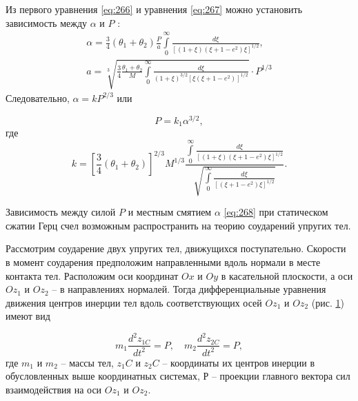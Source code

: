\documentclass[specialist, subf, href, colorlinks=true, 14pt, final]{disser}
\theoremstyle{definition}
\begin{document}
  Из первого уравнения \eqref{eq:266} и уравнения \eqref{eq:267} можно установить зависимость между $\alpha$ и $P$ :
  \[ 
  \begin{array}{l}
    \alpha = \displaystyle \frac{3}{4}(\theta_1 + \theta_2) \displaystyle \frac{P}{a} \int \limits_0^{\infty} \displaystyle \frac{d \xi}{\left[(1 + \xi)(\xi + 1 - e^2)\xi\right]^{1/2}},\\
    a = \sqrt[\displaystyle 3]{\displaystyle \frac{3}{4} \frac{\theta_1 + \theta_2}{M} \int\limits_0^{\infty} \displaystyle \frac{d \xi}{(1 + \xi)^{3/2}\left[\xi(\xi + 1 - e^2)\right]^{1/2}} } \cdot P^{1/3}
  \end{array}
  \]
  Следовательно, $\alpha = k P^{2/3}$ или 
  \addtocounter{equation}{1}
  \begin{equation}\label{eq:268}
   P = k_1\alpha^{3/2},
    \tag{8}
  \end{equation}
  где
  \[ 
    k = \left[ \frac{3}{4}(\theta_1 + \theta_2) \right]^{2/3} M^{1/3} \frac{ \displaystyle \int\limits_0^{\infty} \frac{d \xi}{\left[(1 + \xi)(\xi + 1 - e^2)\xi\right]^{1/2}} }{\displaystyle \sqrt{\int\limits_0^{\infty} \frac{d \xi}{\left[(\xi + 1 - e^2)\xi\right]^{1/2}}}}.
   \]

Зависимость между силой $P$ и местным смятием $\alpha$ \eqref{eq:268} при статическом сжатии Герц счел возможным распространить на теорию соударений упругих тел.

Рассмотрим соударение двух упругих тел, движущихся 
поступательно. Скорости в момент соударения предположим 
направленными вдоль нормали в месте контакта тел. Расположим оси координат $Ox$ и $Oy$ в касательной плоскости, а оси $Oz_1$ и $Oz_2$ -- в направлениях нормалей. Тогда дифференциальные уравнения движения центров инерции тел вдоль соответствующих осей $Oz_1$ и $Oz_2$ (рис. \ref{2-6-1}) имеют вид
\addtocounter{equation}{1}
\begin{equation}\label{eq:269}
   m_1 \frac{d^2z_{1C}}{dt^2} = P, \quad m_2\frac{d^2z_{2C}}{dt^2} = P,
    \tag{9}
\end{equation}
где $m_1$ и $m_2$ -- массы тел, $z_1C$ и $z_2C$ -- координаты их  центров инерции в обусловленных выше координатных системах, $Р$ -- проекции главного вектора сил взаимодействия на оси $Oz_1$ и $Oz_2$.
\begin{figure}[!htp]
  \caption{}
  \label{2-6-1}
\end{figure}
\end{document}
